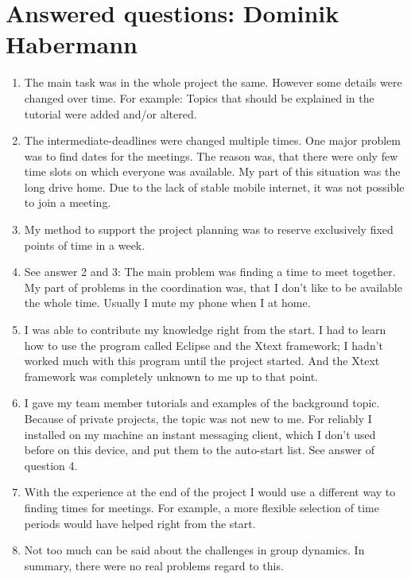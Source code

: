 \documentclass[
fontsize=11pt,
paper=a4,
abstract=true,
numbers=noenddot,
listof=totoc,
bibliography=totoc,
twoside,
open=right,
cleardoublepage=plain,
parskip=half+, %
BCOR=1cm, %
]{scrreprt}
\begin{document}
\section{Answered questions: Dominik Habermann}\label{ss:AnsweredQuestionsDominikHabermann}
\begin{enumerate}
    \item The main task was in the whole project the same. However some details were changed over time. For example: Topics that should be explained in the tutorial were added and/or altered.
    \item The intermediate-deadlines were changed multiple times. One major problem was to find dates for the meetings. The reason was, that there were only few time slots on which everyone was available. My part of this situation was the long drive home. Due to the lack of stable mobile internet, it was not possible to join a meeting.
    \item My method to support the project planning was to reserve exclusively fixed points of time in a week.
    \item See answer 2 and 3: The main problem was finding a time to meet together. My part of problems in the coordination was, that I don't like to be available the whole time. Usually I mute my phone when I at home.
    \item I was able to contribute my knowledge right from the start. I had to learn how to use the program called Eclipse and the Xtext framework; I hadn't worked much with this program until the project started. And the Xtext framework was completely unknown to me up to that point.
    \item I gave my team member tutorials and examples of the background topic. Because of private projects, the topic was not new to me. For reliably I installed on my machine an instant messaging client, which I don't used before on this device, and put them to the auto-start list. See answer of question 4.
    \item With the experience at the end of the project I would use a different way to finding times for meetings. For example, a more flexible selection of time periods would have helped right from the start.
    \item Not too much can be said about the challenges in group dynamics. In summary, there were no real problems regard to this.
\end{enumerate}
\end{document}
